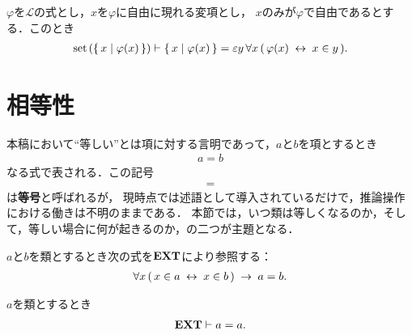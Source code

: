 	\begin{screen}
		\begin{thm}
		\label{thm:if_a_class_is_a_set_then_equal_to_some_epsilon_term}
			$\varphi$を$\mathcal{L}$の式とし，$x$を$\varphi$に自由に現れる変項とし，
			$x$のみが$\varphi$で自由であるとする．このとき
			\begin{align}
				\operatorname*{set}\hspace{0.15em}(\{\, x \mid \varphi(x)\, \}) \vdash \{\, x \mid \varphi(x)\, \} 
				= \varepsilon y\, \forall x\, (\, \varphi(x) \hspace{0.25em}\leftrightarrow\hspace{0.25em} x \in y\, ).
			\end{align}
		\end{thm}
	\end{screen}
	
\section{相等性}
	本稿において``等しい''とは項に対する言明であって，$a$と$b$を項とするとき
	\begin{align}
		a = b
	\end{align}
	なる式で表される．この記号
	\begin{align}
		=
	\end{align}
	は{\bf 等号}と呼ばれるが，
	現時点では述語として導入されているだけで，推論操作における働きは不明のままである．
	本節では，いつ類は等しくなるのか，そして，等しい場合に何が起きるのか，の二つが主題となる．
	
	\begin{screen}
		\begin{axm}
			$a$と$b$を類とするとき次の式を$\mbox{{\bf EXT}}$により参照する：
			\begin{align}
				\forall x\, (\, x \in a \hspace{0.25em}\leftrightarrow\hspace{0.25em} x \in b\, ) \hspace{0.25em}\rightarrow\hspace{0.25em} a=b.
			\end{align}
		\end{axm}
	\end{screen}
	
	\begin{screen}
		\begin{thm}[任意の類は自分自身と等しい]\label{thm:any_class_equals_to_itself}
			$a$を類とするとき
			\begin{align}
				\mbox{{\bf EXT}} \vdash a = a.
			\end{align}
		\end{thm}
	\end{screen}
	
